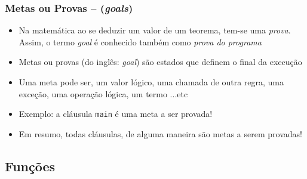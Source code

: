 
\begin{frame}[fragile]

	\frametitle{Metas ou Provas -- (\textit{goals})}
	
	\begin{itemize}
	    
	 \item Na matemática ao se deduzir um valor de um teorema, tem-se uma \textit{prova}. 
	  Assim, o termo  \textit{goal}  é conhecido também como \textit{prova do programa}
	 
	 \pause
	    \item Metas ou provas (do inglês: \textit{goal}) são estados que definem o final da execução
	    
  	 \pause
	    \item Uma meta pode ser, um valor lógico, uma chamada de outra regra, 
	    uma exceção, uma operação lógica, um termo ...etc

  	 \pause
	    \item Exemplo: a cláusula \texttt{main} é uma meta a ser provada!

  	 \pause
	    \item Em resumo, todas cláusulas, de alguma maneira são metas a serem provadas!

	\end{itemize}



\end{frame}
    
\subsection{Funções}

